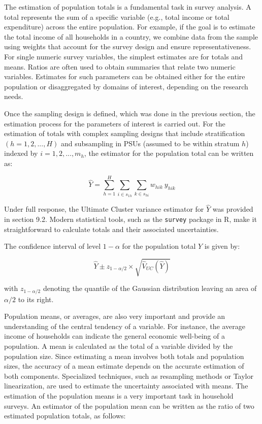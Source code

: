 \documentclass[
  12pt,
]{book}
\begin{document}
The estimation of population totals is a fundamental task in survey analysis. A total represents the sum of a specific variable (e.g., total income or total expenditure) across the entire population. For example, if the goal is to estimate the total income of all households in a country, we combine data from the sample using weights that account for the survey design and ensure representativeness. For single numeric survey variables, the simplest estimates are for totals and means. Ratios are often used to obtain summaries that relate two numeric variables. Estimates for such parameters can be obtained either for the entire population or disaggregated by domains of interest, depending on the research needs.

Once the sampling design is defined, which was done in the previous section, the estimation process for the parameters of interest is carried out. For the estimation of totals with complex sampling designs that include stratification \(\left(h=1,2,...,H\right)\) and subsampling in PSUs (assumed to be within stratum \(h\)) indexed by \(i=1,2,...,m_h\), the estimator for the population total can be written as:

\[
\widehat{Y} = \sum_{h=1}^{H}\sum_{i \in s_{1h}} \sum_{ k \in s_{hi}} w_{hik} \ y_{hik}
\]

Under full response, the Ultimate Cluster variance estimator for \(\widehat{Y}\) was provided in section 9.2. Modern statistical tools, such as the \texttt{survey} package in R, make it straightforward to calculate totals and their associated uncertainties.

The confidence interval of level \(1 - \alpha\) for the population total \(Y\) is given by:

\[
\widehat{Y} \pm z_{1 - \alpha/2} \times \sqrt{\widehat{V}_{UC} \left( \widehat{Y}\right)}
\]

with \(z_{1 - \alpha/2}\) denoting the quantile of the Gaussian distribution leaving an area of \({\alpha/2}\) to its right.

Population means, or averages, are also very important and provide an understanding of the central tendency of a variable. For instance, the average income of households can indicate the general economic well-being of a population. A mean is calculated as the total of a variable divided by the population size. Since estimating a mean involves both totals and population sizes, the accuracy of a mean estimate depends on the accurate estimation of both components. Specialized techniques, such as resampling methods or Taylor linearization, are used to estimate the uncertainty associated with means. The estimation of the population means is a very important task in household surveys. An estimator of the population mean can be written as the ratio of two estimated population totals, as follows:
\end{document}
